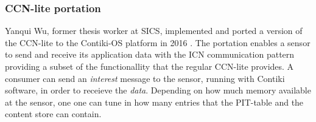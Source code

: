 \subsubsection{CCN-lite portation}
Yanqui Wu, former thesis worker at SICS, implemented and ported a version of the CCN-lite \cite{CCN-LITE} to the Contiki-OS platform in 2016 \cite{yanqui}. The portation enables a sensor to send and receive its application data with the ICN communication pattern providing a subset of the functionallity that the regular CCN-lite provides. A consumer can send an \textit{interest} message to the sensor, running with Contiki software, in order to receieve the \textit{data}. Depending on how much memory available at the sensor, one one can tune in how many entries that the PIT-table and the content store can contain.

